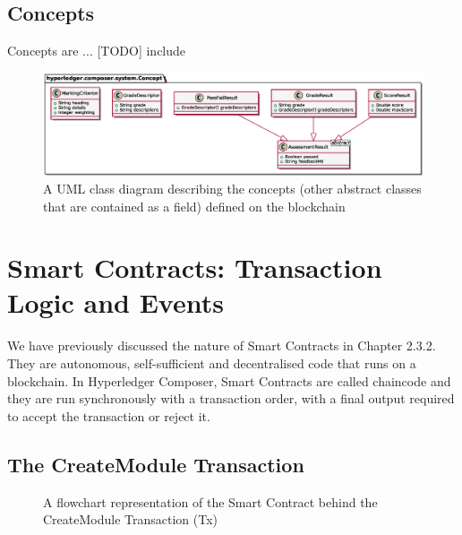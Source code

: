 \subsection{Concepts}

Concepts are ... [TODO] include 

\begin{figure}[!ht] 
    \centering    
    \includegraphics[width=1.0\textwidth]{concepts}
    \caption[Concepts Class Diagram]
        {A UML class diagram describing the concepts (other abstract classes that are contained as a field) defined on the blockchain} 
    \label{fig:concepts}
\end{figure}

\section{Smart Contracts: Transaction Logic and Events}

We have previously discussed the nature of Smart Contracts in Chapter 2.3.2. They are autonomous, self-sufficient and 
decentralised code that runs on a blockchain. In Hyperledger Composer, Smart Contracts are called chaincode and 
they are run synchronously with a transaction order, with a final output required to accept the transaction or reject it.

\subsection{The CreateModule Transaction}
\begin{figure}[!ht]
    \centering
{}
\caption{A flowchart representation of the Smart Contract behind the CreateModule Transaction (Tx)} \label{fig:cmtx}
\end{figure}


